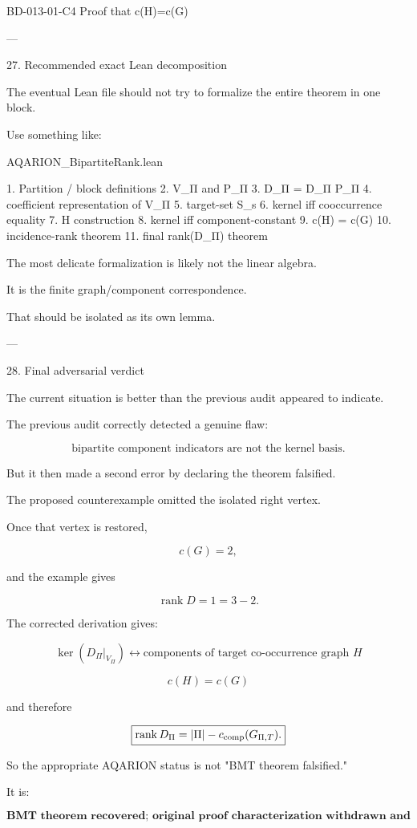 BD-013-01-C4
Proof that c(H)=c(G)


---

27. Recommended exact Lean decomposition

The eventual Lean file should not try to formalize the entire theorem in one block.

Use something like:

AQARION_BipartiteRank.lean

1. Partition / block definitions
2. V_Π and P_Π
3. D_Π = D_Π P_Π
4. coefficient representation of V_Π
5. target-set S_s
6. kernel iff cooccurrence equality
7. H construction
8. kernel iff component-constant
9. c(H) = c(G)
10. incidence-rank theorem
11. final rank(D_Π) theorem

The most delicate formalization is likely not the linear algebra.

It is the finite graph/component correspondence.

That should be isolated as its own lemma.


---

28. Final adversarial verdict

The current situation is better than the previous audit appeared to indicate.

The previous audit correctly detected a genuine flaw:

\[
\boxed{
\text{bipartite component indicators are not the kernel basis.}
}
\]

But it then made a second error by declaring the theorem falsified.

The proposed counterexample omitted the isolated right vertex.

Once that vertex is restored,

\[
c(G)=2,
\]

and the example gives

\[
\operatorname{rank}D=1
=
3-2.
\]

The corrected derivation gives:

\[
\boxed{
\ker(D_\Pi|_{V_\Pi})
\leftrightarrow
\text{components of target co-occurrence graph }H
}
\]

\[
\boxed{
c(H)=c(G)
}
\]

and therefore

\[
\boxed{
\operatorname{rank}D_\Pi
=
|\Pi|-c_{\rm comp}(G_{\Pi,T}).
}
\]

So the appropriate AQARION status is not "BMT theorem falsified."

It is:

\[
\boxed{
\textbf{BMT theorem recovered; original proof characterization withdrawn and replaced.}
}
\]

